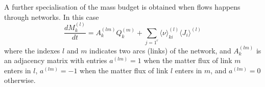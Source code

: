 A further specialisation of the mass budget is obtained when flows happens through networks. In this case
\begin{equation}
\frac{dM_k^{(l)}}{dt} =  A^{(lm)}_k Q_k^{(m)}+ \sum_{j=1^r} \langle\nu \rangle_{ki}^{(l)} \langle J_i \rangle^{(l)}
\end{equation}
where the indexes $l$ and $m$ indicates two arcs (links) of the network, and $A^{(lm)}_k$ is an adjacency matrix with entries $a^{(lm)}=1$ when the matter flux of link $m$ enters in $l$, $a^{(lm)}= - 1$ when the matter flux of link $l$ enters in $m$, and $a^{(lm)}=0$ otherwise.